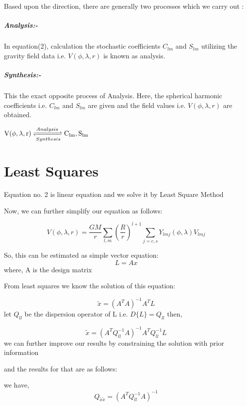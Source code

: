\documentclass[a4paper,12pt]{article}
\begin{document}
Based upon the direction, there are generally two processes which we carry out :

\subparagraph{Analysis:- }  In equation(2), calculation the stochastic coefficients $C_{lm} $ and $S_{lm}$ utilizing the gravity field data i.e. $V(\phi,\lambda,r)$ is known as analysis.
 \subparagraph{Synthesis:- } This the exact opposite process of Analysis. Here, the spherical harmonic coefficients i.e.  $C_{lm} $ and $S_{lm}$ are given and the field values i.e. $V(\phi,\lambda,r)$ are obtained. \\

\centerline{
$\mathrm{V(\phi,\lambda,r)} \xrightleftharpoons[Synthesis]{Analysis} \mathrm{C_{lm}, S_{lm}}$
}

\section{Least Squares}
Equation no. 2 is linear equation and we solve it by Least Square Method

Now, we can further simplify our equation as follows:

\begin{equation}
V(\phi,\lambda,r)=\frac{GM}{r}\sum_{l,m}^{} \left(\frac{R}{r}\right)^{l+1}\sum_{j=c,s}^{}  Y_{lmj} (\phi,\lambda) V_{lmj}
\end{equation}

So, this can be estimated as simple vector equation:
\begin{equation}
  L= Ax  
\end{equation}
where, A is the design matrix

From least squares we know the solution of this equation:

\begin{equation}
\tilde{x} =(A^T A)^{-1} A^T L
\end{equation}
let $ Q_{ll}$ be the dispersion operator of L i.e. $D\{L\}=Q_{ll}$
then,

\begin{equation}
\tilde{x} =(A^T Q_{ll}^{-1} A)^{-1} A^T Q_{ll}^{-1} L
\end{equation}
 we can further improve our results by constraining the solution with prior information
 
 and the results for that are as follows:
 
 we have,
 \begin{equation}
 Q_{\tilde{x}\tilde{x}} = (A^T Q_{ll}^{-1} A)^{-1}
 \end{equation}
 
\end{document}
